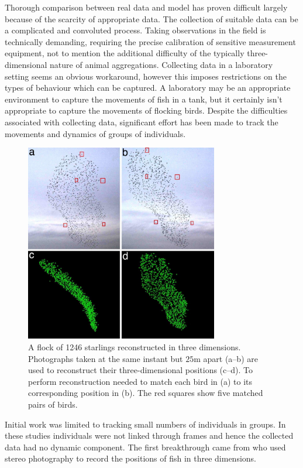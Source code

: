 Thorough comparison between real data and model has proven difficult largely
because of the scarcity of appropriate data. The collection of suitable data
can be a complicated and convoluted process. Taking observations in the field
is technically demanding, requiring the precise calibration of sensitive
measurement equipment, not to mention the additional difficulty of the
typically three-dimensional nature of animal aggregations. Collecting data in a
laboratory setting seems an obvious workaround, however this imposes
restrictions on the types of behaviour which can be captured. A laboratory may
be an appropriate environment to capture the movements of fish in a tank, but
it certainly isn't appropriate to capture the movements of flocking birds.
Despite the difficulties associated with collecting data, significant effort
has been made to track the movements and dynamics of groups of individuals.

\begin{figure}[tb]
  \includegraphics[width=0.75\textwidth]{ballerini_starlings.jpg}
  \caption{A flock of 1246 starlings reconstructed in three dimensions.
    Photographs taken at the same instant but $25$m apart (a--b) are used
    to reconstruct their three-dimensional positions (c--d). To perform
    reconstruction \textcite{ballerini08} needed to match each bird in (a)
    to its corresponding position in (b). The red squares show five matched
    pairs of birds.}
  \label{fig:ballerini}
\end{figure}

Initial work was limited to tracking small numbers of individuals in groups. In
these studies individuals were not linked through frames and hence the
collected data had no dynamic component. The first breakthrough came from
\textcite{cullen65} who used stereo photography to record the positions of fish
in three dimensions.

